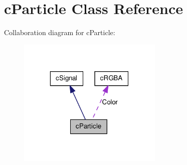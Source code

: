 \hypertarget{classc_particle}{
\section{cParticle Class Reference}
\label{classc_particle}
}


Collaboration diagram for cParticle:\nopagebreak
\begin{figure}[H]
\begin{center}
\leavevmode
\includegraphics[width=196pt]{classc_particle__coll__graph}
\end{center}
\end{figure}
